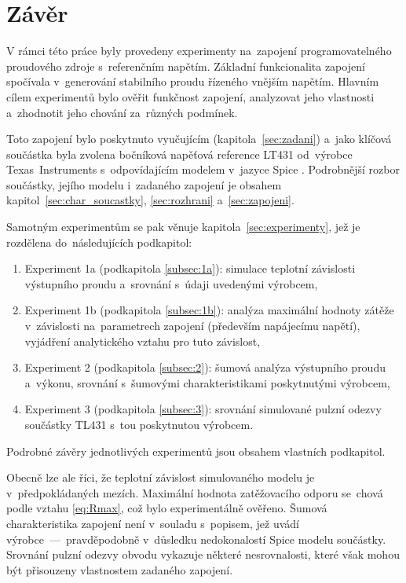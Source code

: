 \documentclass[12pt]{CLASS/protokol}
\begin{document}
\clearpage
\newpage
\section{Závěr}
    V rámci této práce byly provedeny experimenty na~zapojení programovatelného proudového zdroje s~referenčním napětím. Základní funkcionalita zapojení spočívala v~generování stabilního proudu řízeného vnějším napětím. Hlavním cílem experimentů bylo ověřit funkčnost zapojení, analyzovat jeho vlastnosti a~zhodnotit jeho chování za~různých podmínek.
    \par
    Toto zapojení bylo poskytnuto vyučujícím (kapitola~\ref{sec:zadani}) a~jako klíčová součástka byla zvolena bočníková napěťová reference LT431 od~výrobce Texas~Instruments \cite{TI_TL431_datasheet} s~odpovídajícím modelem v~jazyce Spice \cite{TL431_spice_model}. Podrobnější rozbor součástky, jejího modelu i~zadaného zapojení je obsahem kapitol~\ref{sec:char_soucastky}, \ref{sec:rozhrani} a~\ref{sec:zapojeni}.
    \par
    Samotným experimentům se pak věnuje kapitola~\ref{sec:experimenty}, jež je rozdělena do~následujících podkapitol:
    \begin{enumerate}
        \item Experiment 1a (podkapitola \ref{subsec:1a}): simulace teplotní závislosti výstupního proudu a~srovnání s~údaji uvedenými výrobcem,
        \item Experiment 1b (podkapitola \ref{subsec:1b}): analýza maximální hodnoty zátěže v~závislosti na~parametrech zapojení (především napájecímu napětí), vyjádření analytického vztahu pro tuto závislost,
        \item Experiment 2 (podkapitola \ref{subsec:2}): šumová analýza výstupního proudu a~výkonu, srovnání s~šumovými charakteristikami poskytnutými výrobcem,
        \item Experiment 3 (podkapitola \ref{subsec:3}): srovnání simulované pulzní odezvy součástky TL431 s~tou poskytnutou výrobcem. 
    \end{enumerate}
    Podrobné závěry jednotlivých experimentů jsou obsahem vlastních podkapitol. 
    \par
    Obecně lze ale říci, že teplotní závislost simulovaného modelu je v~předpokládaných mezích. Maximální hodnota zatěžovacího odporu se~chová podle vztahu \ref{eq:Rmax}, což bylo experimentálně ověřeno. Šumová charakteristika zapojení není v~souladu s~popisem, jež uvádí výrobce~---~pravděpodobně v~důsledku nedokonalostí Spice modelu součástky. Srovnání pulzní odezvy obvodu vykazuje některé nesrovnalosti, které však mohou být přisouzeny vlastnostem zadaného zapojení.    
\end{document}
